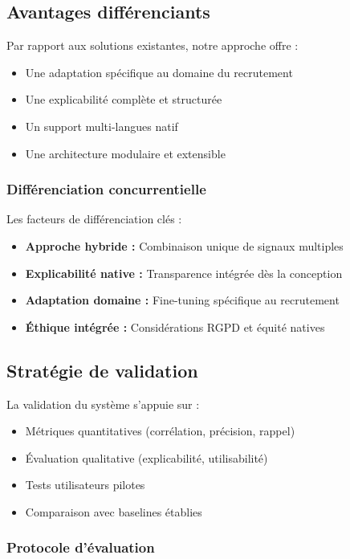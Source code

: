 \documentclass[12pt,a4paper]{report}
\begin{document}
\subsection{Avantages différenciants}

Par rapport aux solutions existantes, notre approche offre :
\begin{itemize}
\item Une adaptation spécifique au domaine du recrutement
\item Une explicabilité complète et structurée
\item Un support multi-langues natif
\item Une architecture modulaire et extensible
\end{itemize}

\subsubsection{Différenciation concurrentielle}

Les facteurs de différenciation clés :
\begin{itemize}
\item \textbf{Approche hybride :} Combinaison unique de signaux multiples
\item \textbf{Explicabilité native :} Transparence intégrée dès la conception
\item \textbf{Adaptation domaine :} Fine-tuning spécifique au recrutement
\item \textbf{Éthique intégrée :} Considérations RGPD et équité natives
\end{itemize}

\subsection{Stratégie de validation}

La validation du système s'appuie sur :
\begin{itemize}
\item Métriques quantitatives (corrélation, précision, rappel)
\item Évaluation qualitative (explicabilité, utilisabilité)
\item Tests utilisateurs pilotes
\item Comparaison avec baselines établies
\end{itemize}

\subsubsection{Protocole d'évaluation}
\end{document}
